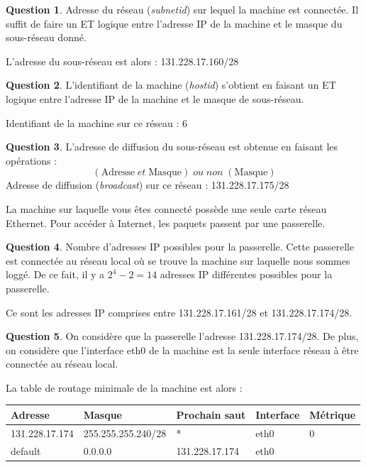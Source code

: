\documentclass[11pt,english,french]{scrreprt}
\theoremstyle{remark}
\theoremstyle{definition}
\newtheorem{ques}{Question}[section]
\begin{document}
\begin{ques}
	Adresse du réseau (\emph{subnetid}) sur lequel la machine est connectée. Il suffit de faire un ET logique entre l'adresse IP de la machine et le masque du sous-réseau donné.
	
	L'adresse du sous-réseau est alors : 131.228.17.160/28
\end{ques}

\begin{ques}
	L'identifiant de la machine (\emph{hostid}) s'obtient en faisant un ET logique entre l'adresse IP de la machine et le masque de sous-réseau.
	
	Identifiant de la machine sur ce réseau : 6
\end{ques}

\begin{ques}
	L'adresse de diffusion du sous-réseau est obtenue en faisant les opérations :\[(\textrm{Adresse}\;et\; \textrm{Masque})\;ou\; non \;(\textrm{Masque})\]
	Adresse de diffusion (\emph{broadcast}) sur ce réseau : 131.228.17.175/28
\end{ques}

La machine sur laquelle vous êtes connecté possède une seule carte réseau Ethernet. Pour accéder à Internet, les paquets passent par une passerelle.

\begin{ques}
	Nombre d'adresses IP possibles pour la passerelle. Cette passerelle est connectée au réseau local où se trouve la machine sur laquelle nous sommes loggé. De ce fait, il y a $2^4 - 2 = 14$ adresses IP différentes possibles pour la passerelle.
	
	Ce sont les adresses IP comprises entre 131.228.17.161/28 et 131.228.17.174/28.
\end{ques}

\begin{ques}
	On considère que la passerelle l'adresse 131.228.17.174/28. De plus, on considère que l'interface eth0 de la machine est la seule interface réseau à être connectée au réseau local.
	
	La table de routage minimale de la machine est alors :
	
	\begin{tabularx}{\textwidth}{XXXll}
		\toprule 
		Adresse & Masque & Prochain saut & Interface & Métrique\tabularnewline
		\midrule
		\midrule 
		131.228.17.174 & 255.255.255.240/28 & {*} & eth0 & 0\tabularnewline
		\midrule 
		default & 0.0.0.0 & 131.228.17.174 & eth0 & \tabularnewline
		\bottomrule
	\end{tabularx}
\end{ques}
\end{document}
